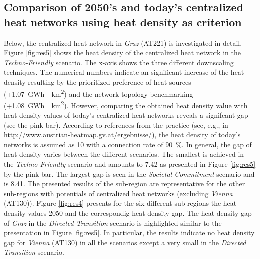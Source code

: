 \subsection{Comparison of 2050's and today's centralized heat networks using heat density as criterion}\label{res:5}
Below, the centralized heat network in \textit{Graz} (AT221) is investigated in detail. Figure \ref{fig:res5} shows the heat density of the centralized heat network in the \textit{Techno-Friendly} scenario. The x-axis shows the three different downscaling techniques. The numerical numbers indicate an significant increase of the heat density resulting by the prioritized preference of heat sources (+\SI{1.07}{GWh \per km^2}) and the network topology benchmarking (+\SI{1.08}{GWh \per km^2}). However, comparing the obtained heat density value with heat density values of today's centralized heat networks reveals a signifcant gap (see the pink bar). According to references from the practice (see, e.g., in \url{http://www.austrian-heatmap.gv.at/ergebnisse/}), the heat density of today's networks is assumed as \SI{10}{} with a connection rate of \SI{90}{\%}. In general, the gap of heat density varies between the different scenarios. The smallest is achieved in the \textit{Techno-Friendly} scenario and amounts to \SI{7.42}{} as presented in Figure \ref{fig:res5} by the pink bar. The largest gap is seen in the \textit{Societal Commitment} scenario and is \SI{8.41}{}. The presented results of the sub-region are representative for the other sub-regions with potentials of centralized heat networks (excluding \textit{Vienna} (AT130)). Figure \ref{fig:res4} presents for the six different sub-regions the heat density values 2050 and the correspondig heat density gap. The heat density gap of \textit{Graz} in the \textit{Directed Transition} scenario is highlighted similar to the presentation in Figure \ref{fig:res5}. In particular, the results indicate no heat density gap for \textit{Vienna} (AT130) in all the scenarios except a very small in the \textit{Directed Transition} scenario.  

